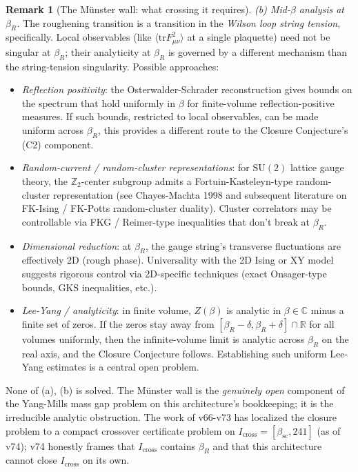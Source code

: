 \documentclass[11pt]{article}
\theoremstyle{definition}
\newtheorem{remark}[theorem]{Remark}
\newcommand{\SU}{\mathrm{SU}}
\newcommand{\tr}{\mathrm{tr}}
\newcommand{\R}{\mathbb{R}}
\newcommand{\Z}{\mathbb{Z}}
\newcommand{\betasc}{\beta_{\mathrm{sc}}}
\begin{document}
\begin{remark}[The M\"unster wall: what crossing it requires]
\emph{(b) Mid-$\beta$ analysis at $\beta_R$.}  The roughening
transition is a transition in the \emph{Wilson loop string tension},
specifically.  Local observables \textup{(}like
$\langle\tr F_{\mu\nu}^2\rangle$ at a single plaquette\textup{)}
need not be singular at $\beta_R$; their analyticity at $\beta_R$ is
governed by a different mechanism than the string-tension
singularity.  Possible approaches:
\begin{itemize}[nosep]
\item \emph{Reflection positivity}: the Osterwalder-Schrader
   reconstruction gives bounds on the spectrum that hold uniformly
   in $\beta$ for finite-volume reflection-positive measures.  If
   such bounds, restricted to local observables, can be made
   uniform across $\beta_R$, this provides a different route to
   the Closure Conjecture's (C2) component.
\item \emph{Random-current / random-cluster representations}: 
   for $\SU(2)$ lattice gauge theory, the $\Z_2$-center subgroup
   admits a Fortuin-Kasteleyn-type random-cluster representation
   \textup{(}see Chayes-Machta 1998 and subsequent literature on
   FK-Ising / FK-Potts random-cluster duality\textup{)}.  Cluster correlators may be controllable
   via FKG / Reimer-type inequalities that don't break at $\beta_R$.
\item \emph{Dimensional reduction}: at $\beta_R$, the gauge string's
   transverse fluctuations are effectively 2D
   \textup{(}rough phase\textup{)}.  Universality with the 2D
   Ising or XY model suggests rigorous control via
   2D-specific techniques \textup{(}exact Onsager-type bounds, GKS
   inequalities, etc.\textup{)}.
\item \emph{Lee-Yang / analyticity}: in finite volume, $Z(\beta)$ is
   analytic in $\beta\in\mathbb{C}$ minus a finite set of zeros.  If the
   zeros stay away from $[\beta_R-\delta,\beta_R+\delta]\cap\R$ for
   all volumes uniformly, then the infinite-volume limit is
   analytic across $\beta_R$ on the real axis, and the Closure
   Conjecture follows.  Establishing such uniform Lee-Yang
   estimates is a central open problem.
\end{itemize}

None of (a), (b) is solved.  The M\"unster wall is the
\emph{genuinely open} component of the Yang-Mills mass gap problem
on this architecture's bookkeeping; it is the irreducible analytic
obstruction.  The work of v66-v73 has localized the closure problem
to a compact crossover certificate problem on $I_{\mathrm{cross}}=[\betasc,241]$
\textup{(}as of v74\textup{)}; v74 honestly frames that
$I_{\mathrm{cross}}$ contains $\beta_R$ and that this architecture
cannot close $I_{\mathrm{cross}}$ on its own.


\end{remark}
\end{document}
